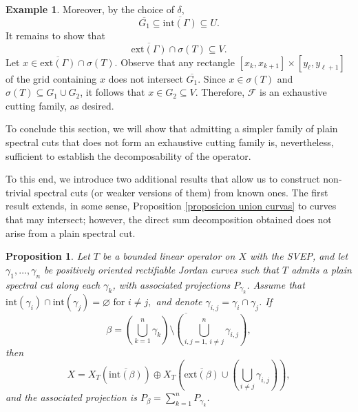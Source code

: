 \documentclass[11pt]{amsart}
\newtheorem{proposition}[theorem]{Proposition}
\theoremstyle{definition}
\newtheorem{example}[theorem]{Example}
\theoremstyle{remark}
\numberwithin{equation}{section}
\begin{document}
\begin{example}
Moreover, by the choice of $\delta$,
$$
\overline{G_1}\subseteq \overline{\mathrm{int}(\Gamma)} \subseteq U.
$$
It remains to show that
$$
\overline{\mathrm{ext}(\Gamma)}\cap \sigma(T)\subseteq V.
$$
Let $x\in \overline{\mathrm{ext}(\Gamma)}\cap \sigma(T)$. Observe that any rectangle $[x_k,x_{k+1}]\times [y_\ell,y_{\ell+1}]$ of the grid containing $x$ does not intersect $\overline{G_1}$. Since $x\in \sigma(T)$ and $\sigma(T)\subseteq G_1\cup G_2$, it follows that $x\in G_2\subseteq V$. Therefore, $\mathcal{F}$ is an exhaustive cutting family, as desired.
\end{example}

To conclude this section, we will show that admitting a simpler family of plain spectral cuts that does not form an exhaustive cutting family is, nevertheless, sufficient to establish the decomposability of the operator.

To this end, we introduce two additional results that allow us to construct non-trivial spectral cuts (or weaker versions of them) from known ones. The first result extends, in some sense, Proposition \ref{proposicion union curvas} to curves that may intersect; however, the direct sum decomposition obtained does not arise from a plain spectral cut.

\smallskip


\begin{proposition}\label{proposicion union curvas que cortan}
Let $T$ be a bounded linear operator on $X$ with the SVEP, and let $\gamma_1,\ldots,\gamma_n$ be positively oriented rectifiable Jordan curves such that $T$ admits a plain spectral cut along each $\gamma_k$, with associated projections $P_{\gamma_k}$. Assume that
$\mathrm{int}(\gamma_i)\cap \mathrm{int}(\gamma_j)=\varnothing \text{ for } i\neq j,
$ and denote $\gamma_{i,j}=\gamma_i\cap\gamma_j$. If
$$
\beta=\overline{(\bigcup\limits_{k=1}^n \gamma_k)\setminus \left(\bigcup_{i,j=1, \ i\neq j}^n \gamma_{i,j} \right) },
$$
then
$$
X = X_T\!\left(\overline{\mathrm{int}(\beta)}\right)
\oplus
X_T\!\left(\overline{\mathrm{ext}(\beta)} \cup
\left(\bigcup_{i\neq j}\gamma_{i,j}\right)\right),
$$
and the associated projection is $P_{\beta}=\sum_{k=1}^n P_{\gamma_k}$.
\end{proposition}
\end{document}
